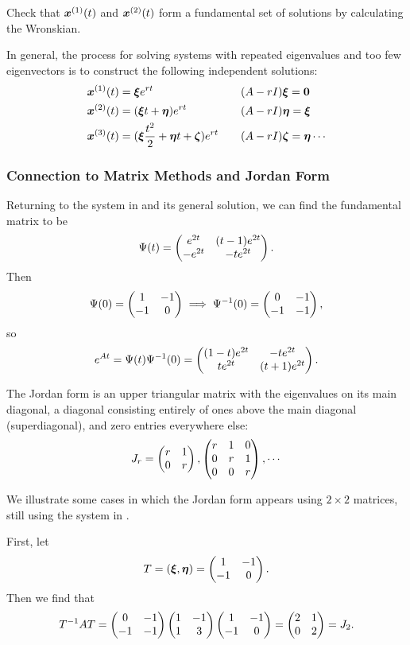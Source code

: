 \begin{exercise}
	Check that $\bm{x}^{(1)}(t)$ and $\bm{x}^{(2)}(t)$ form a fundamental set of solutions by calculating the Wronskian.
\end{exercise}

In general, the process for solving systems with repeated eigenvalues and too few eigenvectors is to construct the following independent solutions:
\begin{equation*}
	\begin{alignedat}{2}
		\bm{x}^{(1)}(t) &= \bm{\xi} e^{rt} \qquad &&(A-rI)\bm{\xi} = \bm{0} \\
		\bm{x}^{(2)}(t) &= (\bm{\xi} t + \bm{\eta})e^{rt} \qquad && (A-rI)\bm{\eta} = \bm{\xi} \\
		\bm{x}^{(3)}(t) &= (\bm{\xi} \frac{t^2}{2} + \bm{\eta} t + \bm{\zeta})e^{rt} \qquad &&(A-rI)\bm{\zeta} = \bm{\eta} \cdots
	\end{alignedat}
\end{equation*}

\subsubsection{Connection to Matrix Methods and Jordan Form}

Returning to the system in  and its general solution, we can find the fundamental matrix to be
\[
\Psi(t) = \begin{pmatrix}e^{2t} & (t-1)e^{2t} \\ -e^{2t} & -te^{2t}\end{pmatrix}.
\]
Then
\[
\Psi(0) = \begin{pmatrix}1 & -1 \\ -1 & 0\end{pmatrix}	\implies \Psi^{-1}(0) = \begin{pmatrix}0 & -1 \\ -1 & -1\end{pmatrix},
\]
so
\[
e^{At} = \Psi(t)\Psi^{-1}(0) = \begin{pmatrix}(1-t)e^{2t} & -te^{2t} \\ te^{2t} & (t+1)e^{2t}\end{pmatrix}.
\]

The Jordan form is an upper triangular matrix with the eigenvalues on its main diagonal, a diagonal consisting entirely of ones above the main diagonal (superdiagonal), and zero entries everywhere else:
\[
J_r = \begin{pmatrix}r & 1 \\ 0 & r\end{pmatrix}, \begin{pmatrix}r & 1 & 0 \\ 0 & r & 1 \\ 0 & 0 & r\end{pmatrix}, \cdots
\]

We illustrate some cases in which the Jordan form appears using $2 \times 2$ matrices, still using the system in .

First, let
\[
T = (\bm{\xi}, \bm{\eta}) = \begin{pmatrix}1 & -1 \\ -1 & 0\end{pmatrix}.
\]
Then we find that
\[
T^{-1}AT = \begin{pmatrix}0 & -1 \\ -1 & -1\end{pmatrix} \begin{pmatrix}1 & -1 \\ 1 & 3\end{pmatrix} \begin{pmatrix}1 & -1 \\ -1 & 0\end{pmatrix} = \begin{pmatrix}2 & 1 \\ 0 & 2\end{pmatrix} = J_2.
\]

